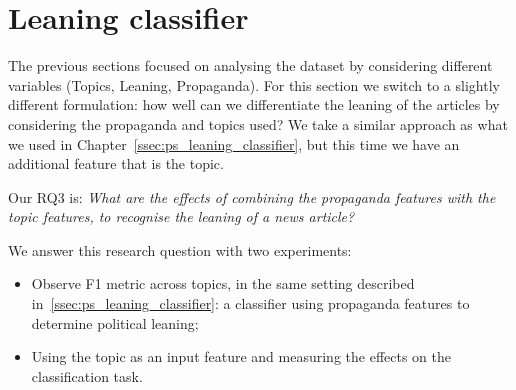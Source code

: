 







\section{\statusred Leaning classifier}
\label{sec:topic_classifier_propaganda}

The previous sections focused on analysing the dataset by considering different variables (Topics, Leaning, Propaganda).
For this section we switch to a slightly different formulation: how well can we differentiate the leaning of the articles by considering the propaganda and topics used?
We take a similar approach as what we used in Chapter~\ref{ssec:ps_leaning_classifier}, but this time we have an additional feature that is the topic.

Our RQ3 is: \emph{What are the effects of combining the propaganda features with the topic features, to recognise the leaning of a news article?}

We answer this research question with two experiments:

\begin{itemize}
    \item Observe F1 metric across topics, in the same setting described in~\ref{ssec:ps_leaning_classifier}: a classifier using propaganda features to determine political leaning;
    \item Using the topic as an input feature and measuring the effects on the classification task.
\end{itemize}



